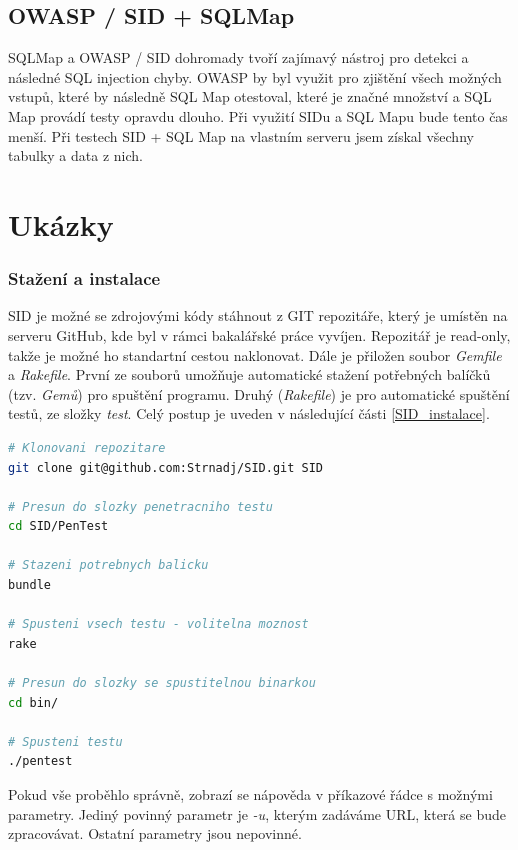 \documentclass[12pt, a4paper]{report}
\begin{document}
\section{OWASP / SID + SQLMap}
SQLMap a OWASP / SID dohromady tvoří zajímavý nástroj pro detekci a následné  SQL injection chyby. OWASP by byl využit pro zjištění všech možných vstupů, které by následně SQL Map otestoval, které je značné množství a SQL Map provádí testy opravdu dlouho. Při využití SIDu a SQL Mapu bude tento čas menší. Při testech SID + SQL Map na vlastním serveru jsem získal všechny tabulky a data z nich.

\chapter{Ukázky}
\subsection{Stažení a instalace}
SID je možné se zdrojovými kódy stáhnout z GIT repozitáře, který je umístěn na serveru GitHub, kde byl v rámci bakalářské práce vyvíjen. Repozitář je read-only, takže je možné ho standartní cestou naklonovat. Dále je přiložen soubor \textit{Gemfile} a \textit{Rakefile}. První ze souborů umožňuje automatické stažení potřebných balíčků (tzv. \textit{Gemů}) pro spuštění programu. Druhý (\textit{Rakefile}) je pro automatické spuštění testů, ze složky \textit{test}. Celý postup je uveden v následující části \ref{SID_instalace}.
\begin{lstlisting}[label=SID_instalace,language=Bash, caption=Instalace]
# Klonovani repozitare
git clone git@github.com:Strnadj/SID.git SID

# Presun do slozky penetracniho testu
cd SID/PenTest

# Stazeni potrebnych balicku
bundle

# Spusteni vsech testu - volitelna moznost
rake

# Presun do slozky se spustitelnou binarkou
cd bin/

# Spusteni testu
./pentest 

\end{lstlisting}
Pokud vše proběhlo správně, zobrazí se nápověda v příkazové řádce s možnými parametry. Jediný povinný parametr je \textit{-u}, kterým zadáváme URL, která se bude zpracovávat. Ostatní parametry jsou nepovinné.
\end{document}
